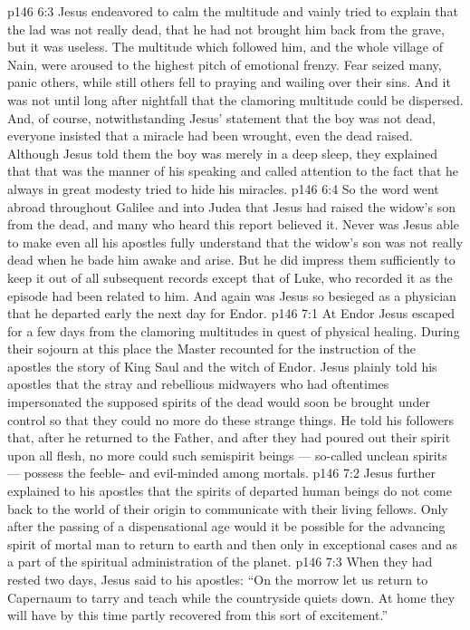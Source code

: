 \vs p146 6:3 Jesus endeavored to calm the multitude and vainly tried to explain that the lad was not really dead, that he had not brought him back from the grave, but it was useless. The multitude which followed him, and the whole village of Nain, were aroused to the highest pitch of emotional frenzy. Fear seized many, panic others, while still others fell to praying and wailing over their sins. And it was not until long after nightfall that the clamoring multitude could be dispersed. And, of course, notwithstanding Jesus’ statement that the boy was not dead, everyone insisted that a miracle had been wrought, even the dead raised. Although Jesus told them the boy was merely in a deep sleep, they explained that that was the manner of his speaking and called attention to the fact that he always in great modesty tried to hide his miracles.
\vs p146 6:4 So the word went abroad throughout Galilee and into Judea that Jesus had raised the widow’s son from the dead, and many who heard this report believed it. Never was Jesus able to make even all his apostles fully understand that the widow’s son was not really dead when he bade him awake and arise. But he did impress them sufficiently to keep it out of all subsequent records except that of Luke, who recorded it as the episode had been related to him. And again was Jesus so besieged as a physician that he departed early the next day for Endor.
\vs p146 7:1 At Endor Jesus escaped for a few days from the clamoring multitudes in quest of physical healing. During their sojourn at this place the Master recounted for the instruction of the apostles the story of King Saul and the witch of Endor. Jesus plainly told his apostles that the stray and rebellious midwayers who had oftentimes impersonated the supposed spirits of the dead would soon be brought under control so that they could no more do these strange things. He told his followers that, after he returned to the Father, and after they had poured out their spirit upon all flesh, no more could such semispirit beings --- so\hyp{}called unclean spirits --- possess the feeble\hyp{} and evil\hyp{}minded among mortals.
\vs p146 7:2 Jesus further explained to his apostles that the spirits of departed human beings do not come back to the world of their origin to communicate with their living fellows. Only after the passing of a dispensational age would it be possible for the advancing spirit of mortal man to return to earth and then only in exceptional cases and as a part of the spiritual administration of the planet.
\vs p146 7:3 When they had rested two days, Jesus said to his apostles: \textcolor{ubdarkred}{“On the morrow let us return to Capernaum to tarry and teach while the countryside quiets down. At home they will have by this time partly recovered from this sort of excitement.”}
